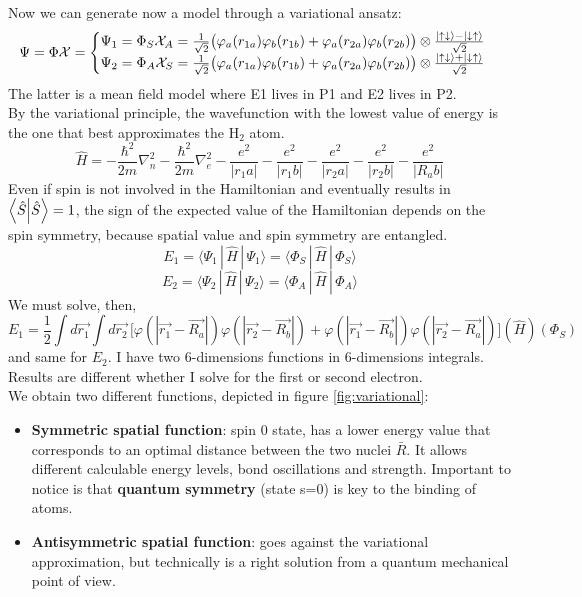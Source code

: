 Now we can generate now a model through a variational ansatz:
\[
\Psi=\Phi \mathcal{X}=\begin{cases}
\Psi_1=\Phi_S \mathcal{X}_A = \frac{1}{\sqrt{2}} \big(\varphi_a(r_{1a}) \varphi_b (r_{1b})+\varphi_a (r_{2a}) \varphi_b (r_{2b})\big) \otimes\frac{\ket{\uparrow\downarrow}-\ket{\downarrow\uparrow}}{\sqrt{2}}\\
\Psi_2=\Phi_A\mathcal{X}_S = \frac{1}{\sqrt{2}} \big(\varphi_a(r_{1a}) \varphi_b (r_{1b})+\varphi_a (r_{2a}) \varphi_b (r_{2b})\big) \otimes\frac{\ket{\uparrow\downarrow}+\ket{\downarrow\uparrow}}{\sqrt{2}}\\
\end{cases}
\]
The latter is a mean field model where E1 lives in P1 and E2 lives in P2.\\
By the variational principle, the wavefunction with the lowest value of energy is the one that best approximates the H$_2$ atom.\\
\[
\hat{H}=-\frac{\hbar^2}{2m}\nabla_n^2-\frac{\hbar^2}{2m}\nabla_e^2-\frac{e^2}{|r_1a|}-\frac{e^2}{|r_1b|}-\frac{e^2}{|r_2a|}-\frac{e^2}{|r_2b|}-\frac{e^2}{|R_ab|}
\]
Even if spin is not involved in the Hamiltonian and eventually results in $\braket{\hat{S}}{\hat{S}}=1$, the sign of the expected value of the Hamiltonian depends on the spin symmetry, because spatial value and spin symmetry are entangled.
\[E_1=\langle{\Psi_1\,|\,\hat{H}\,|\,\Psi_1}\rangle =\langle{\Phi_S\,|\,\hat{H}\,|\,\Phi_S}\rangle\]
\[E_2=\langle{\Psi_2\,|\,\hat{H}\,|\,\Psi_2}\rangle=\langle{\Phi_A\,|\,\hat{H}\,|\,\Phi_A}\rangle\]
We must solve, then,
\[
E_1=\frac{1}{2}\int d\vec{r_1}\int d\vec{r_2}\,\big[\varphi(|\vec{r_1}-\vec{R_a}|)\varphi(|\vec{r_2}-\vec{R_b}|)+\varphi(|\vec{r_1}-\vec{R_b}|)\varphi(|\vec{r_2}-\vec{R_a}|)\big](\hat{H})(\Phi_S)
\]
and same for $E_2$. I have two 6-dimensions functions in 6-dimensions integrals.\\
Results are different whether I solve for the first or second electron.\\
We obtain two different functions, depicted in figure \ref{fig:variational}:
\begin{itemize}
	\item \textbf{Symmetric spatial function}: spin 0 state, has a lower energy value that corresponds to an optimal distance between the two nuclei $\bar{R}$. It allows different calculable energy levels, bond oscillations and strength. Important to notice is that \textbf{quantum symmetry} (state s=0) is key to the binding of atoms. 
	\item \textbf{Antisymmetric spatial function}: goes against the variational approximation, but technically is a right solution from a quantum mechanical point of view.
\end{itemize}
